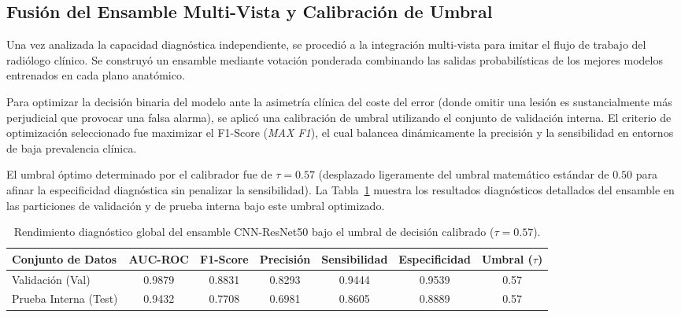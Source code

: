 \subsection{Fusión del Ensamble Multi-Vista y Calibración de Umbral}
Una vez analizada la capacidad diagnóstica independiente, se procedió a la integración multi-vista para imitar el flujo de trabajo del radiólogo clínico. Se construyó un ensamble mediante votación ponderada combinando las salidas probabilísticas de los mejores modelos entrenados en cada plano anatómico. 

Para optimizar la decisión binaria del modelo ante la asimetría clínica del coste del error (donde omitir una lesión es sustancialmente más perjudicial que provocar una falsa alarma), se aplicó una calibración de umbral utilizando el conjunto de validación interna. El criterio de optimización seleccionado fue maximizar el F1-Score (\textit{MAX F1}), el cual balancea dinámicamente la precisión y la sensibilidad en entornos de baja prevalencia clínica.

El umbral óptimo determinado por el calibrador fue de $\tau = 0.57$ (desplazado ligeramente del umbral matemático estándar de $0.50$ para afinar la especificidad diagnóstica sin penalizar la sensibilidad). La Tabla~\ref{tab:ensemble_resnet50} muestra los resultados diagnósticos detallados del ensamble en las particiones de validación y de prueba interna bajo este umbral optimizado.

\begin{table}[htbp]
\centering
\caption{Rendimiento diagnóstico global del ensamble CNN-ResNet50 bajo el umbral de decisión calibrado ($\tau = 0.57$).}
\label{tab:ensemble_resnet50}
\begin{tabular}{lcccccc}
\hline
\textbf{Conjunto de Datos} & \textbf{AUC-ROC} & \textbf{F1-Score} & \textbf{Precisión} & \textbf{Sensibilidad} & \textbf{Especificidad} & \textbf{Umbral ($\tau$)} \\ \hline
Validación (Val)           & 0.9879           & 0.8831            & 0.8293             & 0.9444                & 0.9539                 & 0.57                     \\
Prueba Interna (Test)      & 0.9432           & 0.7708            & 0.6981             & 0.8605                & 0.8889                 & 0.57                     \\ \hline
\end{tabular}
\end{table}

